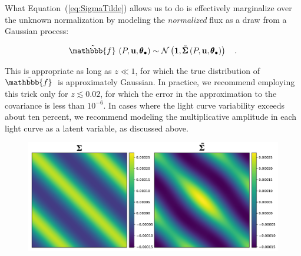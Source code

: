 \documentclass[modern,linenumbers]{aastex62}
\begin{document}

What Equation~(\ref{eq:SigmaTilde}) allows us to do is effectively marginalize over
the unknown normalization by modeling the \emph{normalized} flux as a draw
from a Gaussian process:
%
\begin{linenomath}\begin{align}
        \tilde{\mathbbb{f}\hspace{0.2em}}
        \left(P, \mathbf{u}, \pmb{\theta}_\bullet\right)
        \sim
        \mathcal{N}\left(
        \mathbf{1},
        \tilde{\pmb{\Sigma}} \left(P, \mathbf{u}, \pmb{\theta}_\bullet\right)
        \right)
        \quad.
    \end{align}\end{linenomath}
%
This is appropriate as long as $z \ll 1$, for which the true
distribution of $\tilde{\mathbbb{f}\hspace{0.2em}}$ is approximately Gaussian. In practice,
we recommend employing this trick only for $z \lesssim 0.02$, for which the
error in the approximation to the covariance is less than $10^{-6}$.
In cases where the light curve variability exceeds about ten percent, we recommend
modeling the multiplicative amplitude in each light curve as a latent variable, as discussed
above.

\begin{figure}[t!]
    \begin{centering}
        \includegraphics[width=\linewidth]{figures/normgp.pdf}
    \end{centering}
\end{figure}
\end{document}
